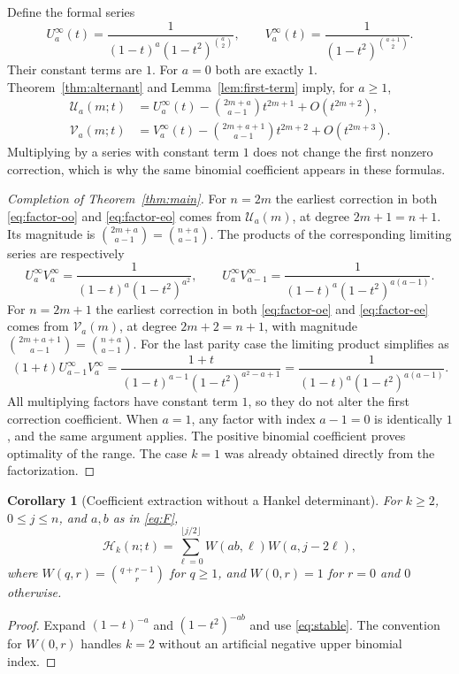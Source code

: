 \documentclass[11pt]{article}
\newtheorem{corollary}[theorem]{Corollary}
\theoremstyle{definition}
\theoremstyle{remark}
\newcommand{\U}{\mathcal U}
\newcommand{\V}{\mathcal V}
\newcommand{\Ht}{\mathcal H}
\numberwithin{equation}{section}
\begin{document}
Define the formal series
\begin{equation}
 U_a^\infty(t)=\frac{1}{(1-t)^a(1-t^2)^{\binom a2}},\qquad
 V_a^\infty(t)=\frac{1}{(1-t^2)^{\binom{a+1}{2}}}.
 \label{eq:limits}
\end{equation}
Their constant terms are $1$. For $a=0$ both are exactly $1$.
Theorem~\ref{thm:alternant} and Lemma~\ref{lem:first-term} imply, for
$a\ge1$,
\begin{align}
 \U_a(m;t)&=U_a^\infty(t)
 -\binom{2m+a}{a-1}t^{2m+1}+O(t^{2m+2}),\label{eq:Udefect}\\
 \V_a(m;t)&=V_a^\infty(t)
 -\binom{2m+a+1}{a-1}t^{2m+2}+O(t^{2m+3}).\label{eq:Vdefect}
\end{align}
Multiplying by a series with constant term $1$ does not change the first
nonzero correction, which is why the same binomial coefficient appears in
these formulas.

\begin{proof}[Completion of Theorem~\ref{thm:main}]
For $n=2m$ the earliest correction in both
\eqref{eq:factor-oo} and \eqref{eq:factor-eo} comes from $\U_a(m)$,
at degree $2m+1=n+1$. Its magnitude is
$\binom{2m+a}{a-1}=\binom{n+a}{a-1}$.
The products of the corresponding limiting series are respectively
\[
 U_a^\infty V_a^\infty
 =\frac1{(1-t)^a(1-t^2)^{a^2}},\qquad
 U_a^\infty V_{a-1}^\infty
 =\frac1{(1-t)^a(1-t^2)^{a(a-1)}}.
\]
For $n=2m+1$ the earliest correction in both
\eqref{eq:factor-oe} and \eqref{eq:factor-ee} comes from $\V_a(m)$,
at degree $2m+2=n+1$, with magnitude
$\binom{2m+a+1}{a-1}=\binom{n+a}{a-1}$.
For the last parity case the limiting product simplifies as
\[
 (1+t)U_{a-1}^\infty V_a^\infty
 =\frac{1+t}{(1-t)^{a-1}(1-t^2)^{a^2-a+1}}
 =\frac1{(1-t)^a(1-t^2)^{a(a-1)}}.
\]
All multiplying factors have constant term $1$, so they do not alter the
first correction coefficient. When $a=1$, any factor with index $a-1=0$
is identically $1$, and the same argument applies. The positive binomial
coefficient proves optimality of the range. The case $k=1$ was already
obtained directly from the factorization.
\end{proof}

\begin{corollary}[Coefficient extraction without a Hankel determinant]
For $k\ge2$, $0\le j\le n$, and $a,b$ as in \eqref{eq:F},
\begin{equation}
 [t^j]\Ht_k(n;t)
 =\sum_{\ell=0}^{\lfloor j/2\rfloor}
 W(ab,\ell)W(a,j-2\ell),
 \label{eq:stable-sum}
\end{equation}
where $W(q,r)=\binom{q+r-1}{r}$ for $q\ge1$, and
$W(0,r)=1$ for $r=0$ and $0$ otherwise.
\end{corollary}
\begin{proof}
Expand $(1-t)^{-a}$ and $(1-t^2)^{-ab}$ and use
\eqref{eq:stable}. The convention for $W(0,r)$ handles $k=2$ without
an artificial negative upper binomial index.
\end{proof}
\end{document}
